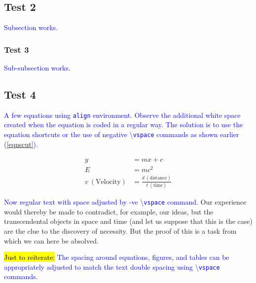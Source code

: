 \documentclass[phd,showgrids]{ndsu-thesis-2022}
\newcommand\italk[1]{\textcolor{blue}{#1}}  %
\newcommand\cmd[1]{\textbackslash\texttt{#1}}  %
\begin{document}
\subsection{Test 2}
\italk{Subsection works.}

\subsubsection{Test 3}
\italk{Sub-subsection works.}

\subsection{Test 4}
\italk{A few equations using \texttt{align} environment. Observe the additional white space created when the equation is coded in a regular way. The solution is to use the equation shortcuts or the use of negative \cmd{vspace} commands as shown earlier (\cref{eqnscut}).}

\begin{align}
y &= mx + c \\
E &= mc^2 \\
v\: (\text{Velocity}) &= \frac{d\: (\text{distance})}{t\: (\text{time})} 
\end{align}

\vspace{-1.5ex}
\italk{Now regular text with space adjusted by -ve \cmd{vspace} command.} Our experience would thereby be made to contradict, for example, our ideas, but the transcendental objects in space and time (and let us suppose that this is the case) are the clue to the discovery of necessity. But the proof of this is a task from which we can here be absolved.

\vspace{-4pt}

\italk{\hl{Just to reiterate:} The spacing around equations, figures, and tables can be appropriately adjusted to match the text double spacing using \cmd{vspace} commands.}

\end{document}
